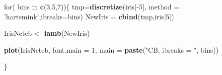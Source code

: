 \documentclass[]{article}
\newenvironment{Shaded}{\begin{snugshade}}{\end{snugshade}}
\newcommand{\KeywordTok}[1]{\textcolor[rgb]{0.13,0.29,0.53}{\textbf{{#1}}}}
\newcommand{\DataTypeTok}[1]{\textcolor[rgb]{0.13,0.29,0.53}{{#1}}}
\newcommand{\DecValTok}[1]{\textcolor[rgb]{0.00,0.00,0.81}{{#1}}}
\newcommand{\StringTok}[1]{\textcolor[rgb]{0.31,0.60,0.02}{{#1}}}
\newcommand{\NormalTok}[1]{{#1}}
\begin{document}
\begin{Shaded}
\begin{Highlighting}[]
\NormalTok{for( bins in }\KeywordTok{c}\NormalTok{(}\DecValTok{3}\NormalTok{,}\DecValTok{5}\NormalTok{,}\DecValTok{7}\NormalTok{))\{}
\NormalTok{tmp=}\KeywordTok{discretize}\NormalTok{(iris[-}\DecValTok{5}\NormalTok{], }\DataTypeTok{method =} \StringTok{'hartemink'}\NormalTok{,}\DataTypeTok{ibreaks=}\NormalTok{bins) }
\NormalTok{NewIris =}\StringTok{ }\KeywordTok{cbind}\NormalTok{(tmp,iris[}\DecValTok{5}\NormalTok{]) }

\NormalTok{IrisNetcb <-}\StringTok{ }\KeywordTok{iamb}\NormalTok{(NewIris)}

\KeywordTok{plot}\NormalTok{(IrisNetcb, }\DataTypeTok{font.main =} \DecValTok{1}\NormalTok{, }\DataTypeTok{main =} \KeywordTok{paste}\NormalTok{(}\StringTok{"CB, ibreaks = "}\NormalTok{, bins))}

\NormalTok{\}}
\end{Highlighting}
\end{Shaded}
\end{document}
